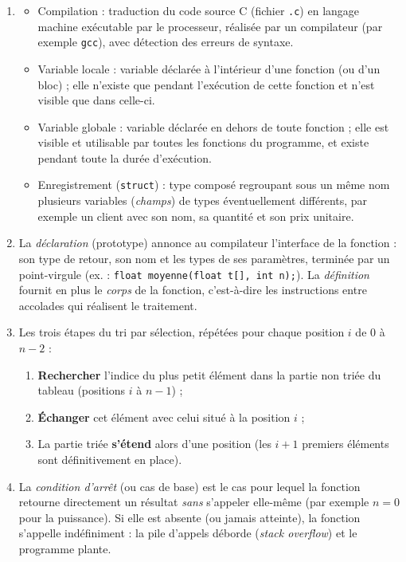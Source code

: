 \documentclass[11pt]{article}
\newcommand{\cle}[1]{{\popxbold\color{popdark}#1}}
\begin{document}
\begin{corrige}
\begin{enumerate}
\item \begin{itemize}
\item \cle{Compilation} : traduction du code source C (fichier \texttt{.c}) en langage machine exécutable par le processeur, réalisée par un compilateur (par exemple \texttt{gcc}), avec détection des erreurs de syntaxe.
\item \cle{Variable locale} : variable déclarée à l'intérieur d'une fonction (ou d'un bloc) ; elle n'existe que pendant l'exécution de cette fonction et n'est visible que dans celle-ci.
\item \cle{Variable globale} : variable déclarée en dehors de toute fonction ; elle est visible et utilisable par toutes les fonctions du programme, et existe pendant toute la durée d'exécution.
\item \cle{Enregistrement} (\texttt{struct}) : type composé regroupant sous un même nom plusieurs variables (\emph{champs}) de types éventuellement différents, par exemple un client avec son nom, sa quantité et son prix unitaire.
\end{itemize}
\item La \emph{déclaration} (prototype) annonce au compilateur l'interface de la fonction : son type de retour, son nom et les types de ses paramètres, terminée par un point-virgule (ex. : \texttt{float moyenne(float t[], int n);}). La \emph{définition} fournit en plus le \emph{corps} de la fonction, c'est-à-dire les instructions entre accolades qui réalisent le traitement.
\item Les trois étapes du tri par sélection, répétées pour chaque position $i$ de $0$ à $n-2$ :
\begin{enumerate}
\item \textbf{Rechercher} l'indice du plus petit élément dans la partie non triée du tableau (positions $i$ à $n-1$) ;
\item \textbf{Échanger} cet élément avec celui situé à la position $i$ ;
\item La partie triée \textbf{s'étend} alors d'une position (les $i+1$ premiers éléments sont définitivement en place).
\end{enumerate}
\item La \emph{condition d'arrêt} (ou cas de base) est le cas pour lequel la fonction retourne directement un résultat \emph{sans} s'appeler elle-même (par exemple $n = 0$ pour la puissance). Si elle est absente (ou jamais atteinte), la fonction s'appelle indéfiniment : la pile d'appels déborde (\emph{stack overflow}) et le programme plante.
\end{enumerate}
\end{corrige}
\end{document}
